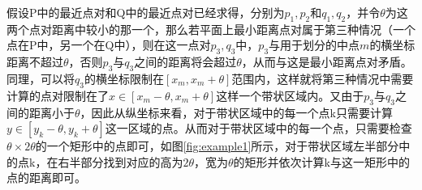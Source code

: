 \documentclass{report}
\begin{document}
假设P中的最近点对和Q中的最近点对已经求得，分别为${p_1, p_2}$和${q_1, q_2}$，并令$\theta$为这两个点对距离中较小的那一个，那么若平面上最小距离点对属于第三种情况（一个点在P中，另一个在Q中），则在这一点对${p_3, q_3}$中，$p_3$与用于划分的中点$m$的横坐标距离不超过$\theta$，否则$p_3$与$q_3$之间的距离将会超过$\theta$，从而与这是最小距离点对矛盾。同理，可以将$q_3$的横坐标限制在$[x_m, x_m+\theta]$范围内，这样就将第三种情况中需要计算的点对限制在了$x\in [x_m-\theta, x_m+\theta]$这样一个带状区域内。又由于$p_3$与$q_3$之间的距离小于$\theta$，因此从纵坐标来看，对于带状区域中的每一个点k只需要计算$y\in [y_k-\theta, y_k+\theta]$这一区域的点。从而对于带状区域中的每一个点，只需要检查$\theta \times 2\theta$的一个矩形中的点即可，如图\ref{fig:example1}所示，对于带状区域左半部分中的点k，在右半部分找到对应的高为$2\theta$，宽为$\theta$的矩形并依次计算k与这一矩形中的点的距离即可。
\end{document}
